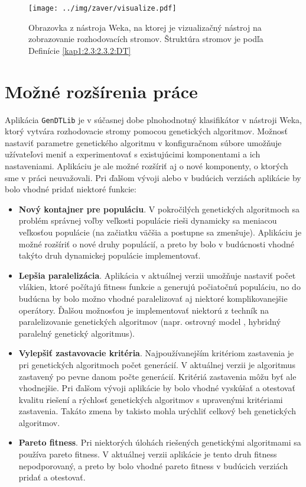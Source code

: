 \begin{figure}[h]
\centering
\centerline{\mbox{\texttt{[image: ../img/zaver/visualize.pdf]}}}
\caption{Obrazovka z nástroja Weka, na ktorej je vizualizačný nástroj na zobrazovanie rozhodovacích stromov. Štruktúra stromov je podľa Definície \ref{kap1:2.3:2.3.2:DT}}\label{fig:wekatree}
\end{figure}

\section{Možné rozšírenia práce}
Aplikácia \verb|GenDTLib| je v súčasnej dobe plnohodnotný klasifikátor v nástroji Weka, ktorý vytvára rozhodovacie stromy pomocou genetických algoritmov. Možnosť nastaviť parametre genetického algoritmu v konfiguračnom súbore umožňuje užívateľovi meniť a experimentovať s existujúcimi komponentami a ich nastaveniami. Aplikáciu je ale možné rozšíriť aj o nové komponenty, o ktorých sme v práci neuvažovali. Pri ďalšom vývoji alebo v budúcich verziách aplikácie by bolo vhodné pridať niektoré funkcie:

\begin{itemize}
\item \textbf{Nový kontajner pre populáciu}. V pokročilých genetických algoritmoch sa problém správnej voľby veľkosti populácie rieši dynamicky sa meniacou veľkosťou populácie (na začiatku väčšia a postupne sa zmenšuje). Aplikáciu je možné rozšíriť o nové druhy populácií, a preto by bolo v budúcnosti vhodné takýto druh dynamickej populácie implementovať.
\item \textbf{Lepšia paralelizácia}. Aplikácia v aktuálnej verzii umožňuje nastaviť počet vlákien, ktoré počítajú fitness funkcie a generujú počiatočnú populáciu, no do budúcna by bolo možno vhodné paralelizovať aj niektoré komplikovanejšie operátory. Ďalšou možnosťou je implementovať niektorú z techník na paralelizovanie genetických algoritmov (napr. ostrovný model \cite{online-islandmodel}, hybridný paralelný genetický algoritmus).
\item \textbf{Vylepšiť zastavovacie kritéria}. Najpoužívanejším kritériom zastavenia je pri genetických algoritmoch počet generácií. V aktuálnej verzii je algoritmus zastavený po pevne danom počte generácií. Kritériá zastavenia môžu byť ale vhodnejšie. Pri ďalšom vývoji aplikácie by bolo vhodné vyskúšať a otestovať kvalitu riešení a rýchlosť genetických algoritmov s upravenými kritériami zastavenia. Takáto zmena by takisto mohla urýchliť celkový beh genetických algoritmov.
\item \textbf{Pareto fitness}. Pri niektorých úlohách riešených genetickými algoritmami sa používa pareto fitness. V aktuálnej verzii aplikácie je tento druh fitness nepodporovaný, a preto by bolo vhodné pareto fitness v budúcich verziách pridať a otestovať.
\end{itemize}